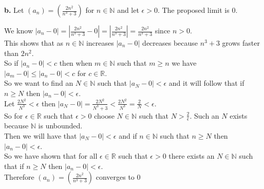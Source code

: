 \documentclass{article}
\begin{document}
{\Large \textbf{b.}} Let $(a_n) = (\frac{2n^2}{n^3 +3})$ for $n\in\mathbb{N}$ and let $\epsilon > 0$. The proposed limit is $0$.
\begin{center}
    \doublespacing
    We know {\large $|a_n - 0| = |\frac{2n^2}{n^3 +3} -0| = |\frac{2n^2}{n^3 +3}| = \frac{2n^2}{n^3 +3}$} since $n > 0$.
    \\This shows that as $n\in\mathbb{N}$ increases $|a_n - 0|$ decreases because $n^3 + 3$ grows faster than $2n^2$.
    \\So if $|a_n - 0| < c$ then when $m\in\mathbb{N}$ such that $m\geq n$ we have $|a_m - 0|\leq |a_n - 0| < c$ for $c\in\mathbb{R}$.
    \\So we want to find an $N\in\mathbb{N}$ such that $|a_N - 0| <\epsilon$ and it will follow that if $n\geq N$ then $|a_n - 0| <\epsilon$.
    \\Let {\large $\frac{2N^2}{N^3} <\epsilon$} then {\large $|a_N - 0| = \frac{2N^2}{N^3 +3} < \frac{2N^2}{N^3} = \frac{2}{N} <\epsilon$}.
     \\So for $\epsilon\in\mathbb{R}$ such that $\epsilon > 0$ choose $N\in\mathbb{N}$ such that {\large $N >\frac{2}{\epsilon}$}. Such an $N$ exists because $\mathbb{N}$ is unbounded.
     \\Then we will have that $|a_N - 0| <\epsilon$ and if $n\in\mathbb{N}$ such that $n\geq N$ then $|a_n - 0| <\epsilon$.
    \\So we have shown that for all $\epsilon\in\mathbb{R}$ such that $\epsilon > 0$ there exists an $N\in\mathbb{N}$ such that if $n\geq N$ then $|a_n - 0| <\epsilon$.
    \\Therefore $(a_n) = (\frac{2n^2}{n^3 +3})$ converges to $0$ \qedsymbol
\end{center}
\end{document}

